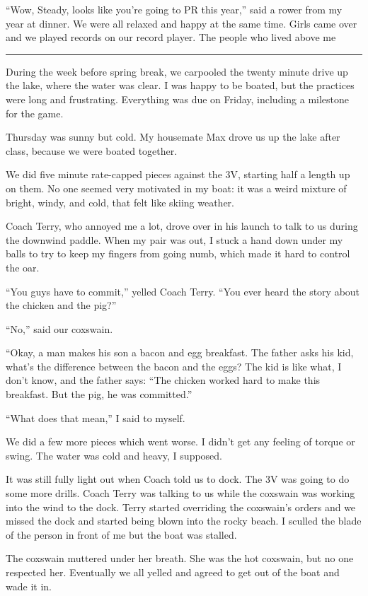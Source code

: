 ``Wow, Steady, looks like you're going to PR this year,'' said a rower from my
year at dinner.  We were all relaxed and happy at the same time.  Girls came
over and we played records on our record player.  The people who lived above me

\plainfancybreak{12pt}{2}{* * *}

During the week before spring break, we carpooled the twenty minute drive up the
lake, where the water was clear.  I was happy to be boated, but the practices
were long and frustrating.  Everything was due on Friday, including a milestone
for the game. 

Thursday was sunny but cold.  My housemate Max drove us up the lake after
class, because we were boated together. 

We did five minute rate-capped pieces against the 3V, starting half a length up
on them.  No one seemed very motivated in my boat: it was a weird mixture of
bright, windy, and cold, that felt like skiing weather.

Coach Terry, who annoyed me a lot, drove over in his launch to talk to us during
the downwind paddle.  When my pair was out, I stuck a hand down under my balls
to try to keep my fingers from going numb, which made it hard to control the
oar.

``You guys have to commit,'' yelled Coach Terry.  ``You ever heard the story
about the chicken and the pig?'' 

``No,'' said our coxswain.  

``Okay, a man makes his son a bacon and egg breakfast.  The father asks his kid,
what's the difference between the bacon and the eggs?  The kid is like what, I
don't know, and the father says: ``The chicken worked hard to make this
breakfast.  But the pig, he was committed.''

``What does that mean,'' I said to myself.

We did a few more pieces which went worse.  I didn't get any feeling of torque
or swing.  The water was cold and heavy, I supposed. 

It was still fully light out when Coach told us to dock.  The 3V was going to do
some more drills.  Coach Terry was talking to us while the coxswain was working
into the wind to the dock.  Terry started overriding the coxswain's orders and
we missed the dock and started being blown into the rocky beach.  I sculled the
blade of the person in front of me but the boat was stalled.

The coxswain muttered under her breath.  She was the hot coxswain, but no one
respected her.  Eventually we all yelled and agreed to get out of the boat and
wade it in.

